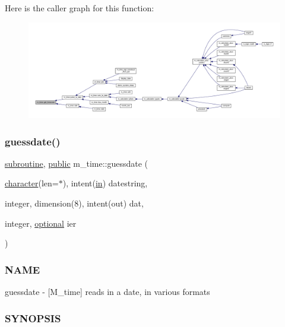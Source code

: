 \begin{DoxyVerb}
Here is the caller graph for this function\+:
\nopagebreak
\begin{figure}[H]
\begin{center}
\leavevmode
\includegraphics[width=350pt]{namespacem__time_a7903410a1d28bcdf3d33ab0c2d74b124_icgraph}
\end{center}
\end{figure}
\mbox{\label{namespacem__time_aa5198c7aa4f3d8411c8ce93046ce3794}} 
\subsubsection{\texorpdfstring{guessdate()}{guessdate()}}
{\footnotesize\ttfamily \hyperlink{M__stopwatch_83_8txt_acfbcff50169d691ff02d4a123ed70482}{subroutine}, \hyperlink{M__stopwatch_83_8txt_a2f74811300c361e53b430611a7d1769f}{public} m\+\_\+time\+::guessdate (\begin{DoxyParamCaption}\item[{\hyperlink{option__stopwatch_83_8txt_abd4b21fbbd175834027b5224bfe97e66}{character}(len=$\ast$), intent(\hyperlink{M__journal_83_8txt_afce72651d1eed785a2132bee863b2f38}{in})}]{datestring,  }\item[{integer, dimension(8), intent(out)}]{dat,  }\item[{integer, \hyperlink{option__stopwatch_83_8txt_aa4ece75e7acf58a4843f70fe18c3ade5}{optional}}]{ier }\end{DoxyParamCaption})}



\subsubsection*{N\+A\+ME}

guessdate -\/ \mbox{[}M\+\_\+time\mbox{]} reads in a date, in various formats 

\subsubsection*{S\+Y\+N\+O\+P\+S\+IS}


\end{DoxyVerb}
